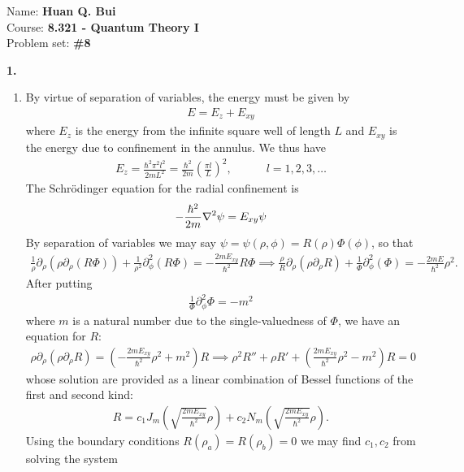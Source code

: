 \documentclass{article}
\theoremstyle{definition}
\newcommand{\p}{\partial}
\newcommand{\f}[2]{\frac{#1}{#2}}
\newcommand{\lp}{\left(}
\newcommand{\rp}{\right)}
\begin{document}
\begin{framed}
\noindent Name: \textbf{Huan Q. Bui}\\
Course: \textbf{8.321 - Quantum Theory I}\\
Problem set: \textbf{\#8}
\end{framed}
	



\noindent \textbf{1. }
\begin{enumerate}[label=(\alph*)]
	\item By virtue of separation of variables, the energy must be given by 
	\begin{align*}
	E = E_{z} + E_{xy}
	\end{align*}
	where $E_z$ is the energy from the infinite square well of length $L$ and $E_{xy}$ is the energy due to confinement in the annulus. We thus have
	\begin{align*}
	E_z = \f{\hbar^2 \pi^2 l^2}{2m L^2} = \f{\hbar^2}{2m} \lp \f{\pi l }{L} \rp^2, \quad\quad\quad l = 1,2,3,\dots
	\end{align*}
	The Schr\"{o}dinger equation for the radial confinement is 
	\begin{align*}
	-\f{\hbar^2}{2m } \laplacian \psi = E_{xy} \psi
	\end{align*}
	By separation of variables we may say $\psi = \psi(\rho,\phi) = R(\rho) \Phi(\phi)$, so that 
	\begin{align*}
	\f{1}{\rho}\p_\rho(\rho \p_\rho (R\Phi)) + \f{1}{\rho^2}\p^2_\phi (R\Phi) = -\f{2mE_{xy}}{\hbar^2}R\Phi \implies \f{\rho}{R}\p_\rho(\rho \p_\rho R) + \f{1}{\Phi}\p^2_\phi (\Phi) = -\f{2mE}{\hbar^2}\rho^2.
	\end{align*}
	After putting
	\begin{align*}
	\f{1}{\Phi}\p^2_\phi \Phi = - m^2 
	\end{align*}
	where $m$ is a natural number due to the single-valuedness of $\Phi$, we have an equation for $R$:
	\begin{align*}
	\rho\p_\rho(\rho \p_\rho R) = \lp -\f{2mE_{xy}}{\hbar^2}\rho^2 + m^2\rp R \implies \rho^2 R'' + \rho R' + \lp \f{2mE_{xy}}{\hbar^2}\rho^2 - m^2 \rp R = 0
	\end{align*}
	whose solution are provided as a linear combination of Bessel functions of the first and second kind:
	\begin{align*}
	R = c_1 J_m\lp \sqrt{\f{2mE_{xy}}{\hbar^2}}\rho\rp + c_2 N_m\lp \sqrt{\f{2mE_{xy}}{\hbar^2}}\rho\rp.
	\end{align*}
	Using the boundary conditions $R(\rho_a) = R(\rho_b) =0$ we may find $c_1,c_2$ from solving the system 

\end{enumerate}
\end{document}
